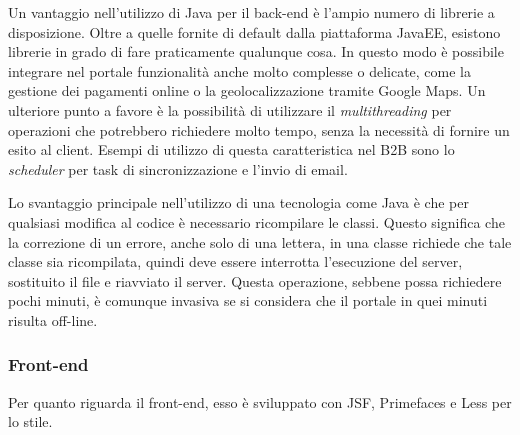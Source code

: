 Un vantaggio nell'utilizzo di Java per il back-end è l'ampio numero di librerie a disposizione. Oltre a quelle fornite di default dalla piattaforma JavaEE, esistono librerie in grado di fare praticamente qualunque cosa. In questo modo è possibile integrare nel portale funzionalità anche molto complesse o delicate, come la gestione dei pagamenti online o la geolocalizzazione tramite Google Maps. Un ulteriore punto a favore è la possibilità di utilizzare il \textit{multithreading} per operazioni che potrebbero richiedere molto tempo, senza la necessità di fornire un esito al client. Esempi di utilizzo di questa caratteristica nel B2B sono lo \textit{scheduler} per task di sincronizzazione e l'invio di email.

Lo svantaggio principale nell'utilizzo di una tecnologia come Java è che per qualsiasi modifica al codice è necessario ricompilare le classi. Questo significa che la correzione di un errore, anche solo di una lettera, in una classe richiede che tale classe sia ricompilata, quindi deve essere interrotta l'esecuzione del server, sostituito il file e riavviato il server. Questa operazione, sebbene possa richiedere pochi minuti, è comunque invasiva se si considera che il portale in quei minuti risulta off-line.

\subsubsection{Front-end}
Per quanto riguarda il front-end, esso è sviluppato con JSF, Primefaces e Less per lo stile.


